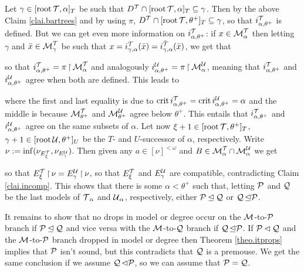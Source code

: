 {Let $\gamma\in[\Root\T,\alpha]_T$ be such that $D^{\T}\cap[\Root\T,\alpha]_T\subset\gamma$. Then by the above Claim \ref{clai.bartrees} and by using $\pi$, $D^{\T}\cap[\Root\T,\theta^+]_T\subset\gamma$, so that $i_{\alpha,\theta^+}^{\T}$ is defined. But we can get even more information on $i_{\alpha,\theta^+}^{\T}$: if $x\in\M_\alpha^{\T}$ then letting $\gamma$ and $\bar x\in\M_\gamma^{\T}$ be such that $x=i_{\gamma,\alpha}^{\T}(\bar x)=i_{\gamma,\alpha}^{\bar\T}(\bar x)$, we get that

so that $i_{\alpha,\theta^+}^{\T}=\pi\restr\M_\alpha^{\T}$ and analogously $i_{\alpha,\theta^+}^{\U}=\pi\restr\M_\alpha^{\U}$, meaning that $i_{\alpha,\theta^+}^{\T}$ and $i_{\alpha,\theta^+}^{\U}$ agree when both are defined. This leads to
\eq{
\P^{\M_\alpha^{\T}}(\alpha)=\P^{\M_{\theta^+}^{\T}}(\alpha)=\P^{\M_{\theta^+}^{\U}}(\alpha)=\P^{\M_\alpha^{\U}}(\alpha),
}

where the first and last equality is due to $\crit i_{\alpha,\theta^+}^{\T}=\crit i_{\alpha,\theta^+}^{\U}=\alpha$ and the middle is because $\M_{\theta^+}^{\T}$ and $\M_{\theta^+}^{\U}$ agree below $\theta^+$. This entails that $i_{\alpha,\theta^+}^{\T}$ and $i_{\alpha,\theta^+}^{\U}$ agree on the same subsets of $\alpha$. Let now $\xi+1\in[\Root\T,\theta^+]_T$, $\gamma+1\in[\Root\U,\theta^+]_U$ be the $T$- and $U$-successor of $\alpha$, respectively. Write $\nu:=\inf(\nu_{E_\xi^{\T}},\nu_{E_\gamma^{\U}})$. Then given any $a\in[\nu]^{<\omega}$ and $B\in\M_\alpha^{\T}\cap\M_\alpha^{\U}$ we get

so that $E_\xi^{\T}\restr\nu=E_\gamma^{\U}\restr\nu$, so that $E_\xi^{\T}$ and $E_\gamma^{\U}$ are compatible, contradicting Claim \ref{clai.incomp}. This shows that there is some $\alpha<\theta^+$ such that, letting $\P$ and $\Q$ be the last models of $\T_\alpha$ and $\U_\alpha$, respectively, either $\P\init\Q$ or $\Q\init\P$.

\qquad It remains to show that no drops in model or degree occur on the $\M$-to-$\P$ branch if $\P\init\Q$ and vice versa with the $\M$-to-$\Q$ branch if $\Q\init\P$. If $\P\pinit\Q$ and the $\M$-to-$\P$ branch dropped in model or degree then Theorem \ref{theo.itprops} implies that $\P$ isn't sound, but this contradicts that $\Q$ is a premouse. We get the same conclusion if we assume $\Q\pinit\P$, so we can assume that $\P=\Q$.

}

